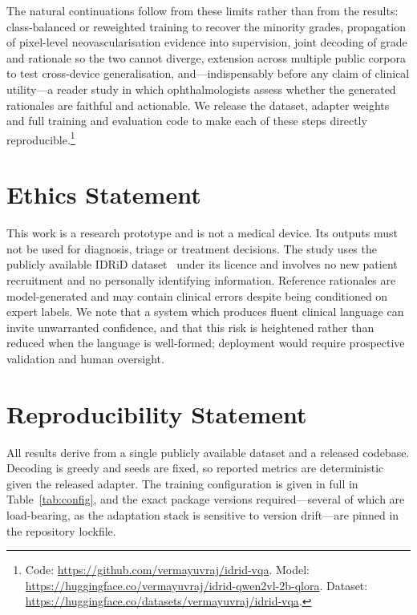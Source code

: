 \documentclass[conference]{IEEEtran}
\begin{document}
The natural continuations follow from these limits rather than from the results:
class-balanced or reweighted training to recover the minority grades,
propagation of pixel-level neovascularisation evidence into supervision, joint
decoding of grade and rationale so the two cannot diverge, extension across
multiple public corpora to test cross-device generalisation, and---indispensably
before any claim of clinical utility---a reader study in which ophthalmologists
assess whether the generated rationales are faithful and actionable. We release
the dataset, adapter weights and full training and evaluation code to make each
of these steps directly reproducible.\footnote{Code:
\url{https://github.com/vermayuvraj/idrid-vqa}. Model:
\url{https://huggingface.co/vermayuvraj/idrid-qwen2vl-2b-qlora}. Dataset:
\url{https://huggingface.co/datasets/vermayuvraj/idrid-vqa}.}

\section*{Ethics Statement}
This work is a research prototype and is not a medical device. Its outputs must
not be used for diagnosis, triage or treatment decisions. The study uses the
publicly available IDRiD dataset~\cite{porwal2018idrid} under its licence and
involves no new patient recruitment and no personally identifying information.
Reference rationales are model-generated and may contain clinical errors despite
being conditioned on expert labels. We note that a system which produces fluent
clinical language can invite unwarranted confidence, and that this risk is
heightened rather than reduced when the language is well-formed; deployment would
require prospective validation and human oversight.

\section*{Reproducibility Statement}
All results derive from a single publicly available dataset and a released
codebase. Decoding is greedy and seeds are fixed, so reported metrics are
deterministic given the released adapter. The training configuration is given in
full in Table~\ref{tab:config}, and the exact package versions required---several
of which are load-bearing, as the adaptation stack is sensitive to version
drift---are pinned in the repository lockfile.



\end{document}
